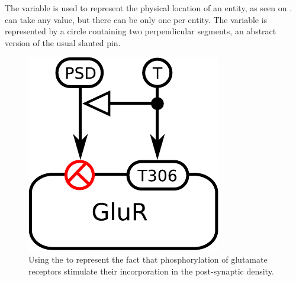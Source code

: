 The variable  is used to represent the physical location of an entity, as seen on \label{sec:location}.  can take any value, but there can be only one  per entity. The variable is represented by a circle containing two perpendicular segments, an abstract version of the usual slanted pin.

\begin{figure}[H]
  \centering
  \includegraphics[scale = 0.5]{examples/ex-location-2}
  \caption{Using the   to represent the fact that phosphorylation of glutamate receptors stimulate their incorporation in the post-synaptic density.}
  \label{fig:ex-location}
\end{figure}



